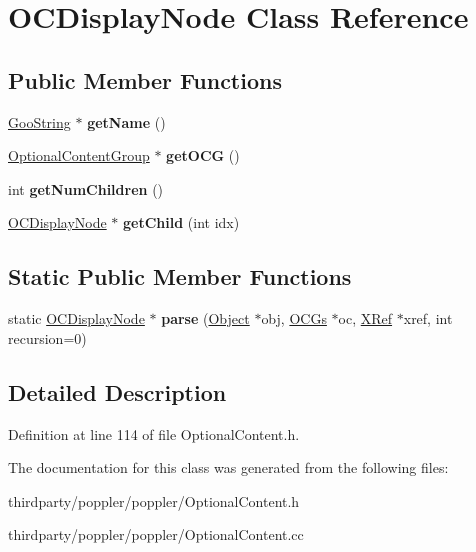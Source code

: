 \hypertarget{class_o_c_display_node}{}\section{O\+C\+Display\+Node Class Reference}
\label{class_o_c_display_node}
\subsection*{Public Member Functions}
\begin{DoxyCompactItemize}
\item 
\mbox{\label{class_o_c_display_node_a7015884ae4fd720374184ba905234f51}} 
\hyperlink{class_goo_string}{Goo\+String} $\ast$ {\bfseries get\+Name} ()
\item 
\mbox{\label{class_o_c_display_node_ae72c5e4c335d89b5930a470bbc5aef3f}} 
\hyperlink{class_optional_content_group}{Optional\+Content\+Group} $\ast$ {\bfseries get\+O\+CG} ()
\item 
\mbox{\label{class_o_c_display_node_ac3e4f9f2e0db57cff5663a4ff39c79ed}} 
int {\bfseries get\+Num\+Children} ()
\item 
\mbox{\label{class_o_c_display_node_adcf64ad307362a48778f9078ca9ddb36}} 
\hyperlink{class_o_c_display_node}{O\+C\+Display\+Node} $\ast$ {\bfseries get\+Child} (int idx)
\end{DoxyCompactItemize}
\subsection*{Static Public Member Functions}
\begin{DoxyCompactItemize}
\item 
\mbox{\label{class_o_c_display_node_afd46cfb5d42dc382106512cb6e35f8c5}} 
static \hyperlink{class_o_c_display_node}{O\+C\+Display\+Node} $\ast$ {\bfseries parse} (\hyperlink{class_object}{Object} $\ast$obj, \hyperlink{class_o_c_gs}{O\+C\+Gs} $\ast$oc, \hyperlink{class_x_ref}{X\+Ref} $\ast$xref, int recursion=0)
\end{DoxyCompactItemize}


\subsection{Detailed Description}


Definition at line 114 of file Optional\+Content.\+h.



The documentation for this class was generated from the following files\+:\begin{DoxyCompactItemize}
\item 
thirdparty/poppler/poppler/Optional\+Content.\+h\item 
thirdparty/poppler/poppler/Optional\+Content.\+cc\end{DoxyCompactItemize}
